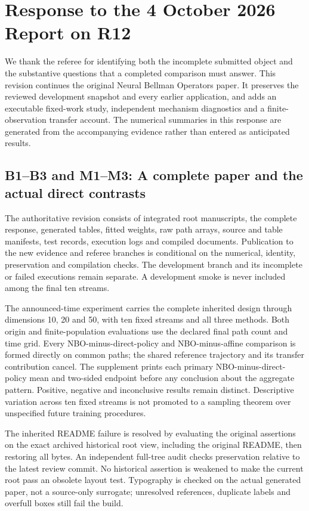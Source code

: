 \section*{Response to the 4 October 2026 Report on R12}
We thank the referee for identifying both the incomplete submitted object and the substantive questions that a completed comparison must answer. This revision continues the original Neural Bellman Operators paper. It preserves the reviewed development snapshot and every earlier application, and adds an executable fixed-work study, independent mechanism diagnostics and a finite-observation transfer account. The numerical summaries in this response are generated from the accompanying evidence rather than entered as anticipated results.

\subsection*{B1--B3 and M1--M3: A complete paper and the actual direct contrasts}
The authoritative revision consists of integrated root manuscripts, the complete response, generated tables, fitted weights, raw path arrays, source and table manifests, test records, execution logs and compiled documents. Publication to the new evidence and referee branches is conditional on the numerical, identity, preservation and compilation checks. The development branch and its incomplete or failed executions remain separate. A development smoke is never included among the final ten streams.

The announced-time experiment carries the complete inherited design through dimensions 10, 20 and 50, with ten fixed streams and all three methods. Both origin and finite-population evaluations use the declared final path count and time grid. Every NBO-minus-direct-policy and NBO-minus-affine comparison is formed directly on common paths; the shared reference trajectory and its transfer contribution cancel. The supplement prints each primary NBO-minus-direct-policy mean and two-sided endpoint before any conclusion about the aggregate pattern. Positive, negative and inconclusive results remain distinct. Descriptive variation across ten fixed streams is not promoted to a sampling theorem over unspecified future training procedures.

The inherited README failure is resolved by evaluating the original assertions on the exact archived historical root view, including the original README, then restoring all bytes. An independent full-tree audit checks preservation relative to the latest review commit. No historical assertion is weakened to make the current root pass an obsolete layout test. Typography is checked on the actual generated paper, not a source-only surrogate; unresolved references, duplicate labels and overfull boxes still fail the build.

